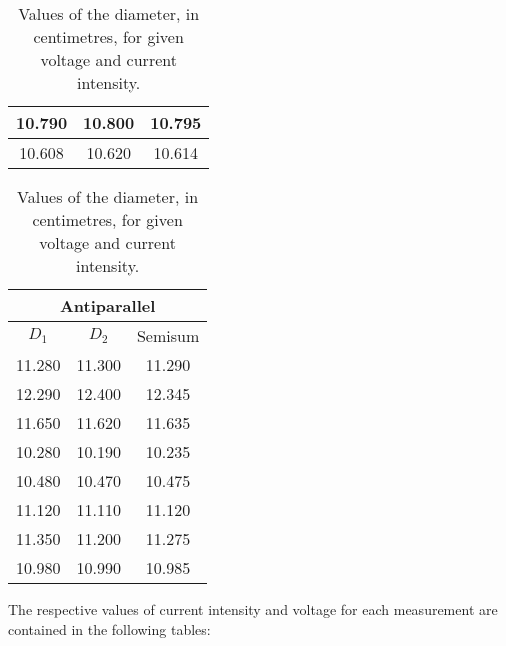 \begin{table}[H]
\begin{tabular}{|c|c|c|}
            \hline
            10.790 & 10.800 & 10.795 \\
            \hline
            10.608 & 10.620 & 10.614 \\
            \hline
        \end{tabular}
        \vspace{1cm}
        \begin{tabular}{|c|c|c|}
            \hline
            \multicolumn{3}{|c|}{\textbf{Antiparallel}} \\
            \hline
            \textbf{$D_1$} & \textbf{$D_2$} & Semisum \\
            \hline
            11.280 & 11.300 & 11.290 \\
            \hline
            12.290 & 12.400 & 12.345 \\
            \hline
            11.650 & 11.620 & 11.635 \\
            \hline
             10.280 & 10.190 & 10.235 \\
            \hline
            10.480 & 10.470 & 10.475 \\
            \hline
            11.120 & 11.110 & 11.120 \\
            \hline
             11.350 & 11.200 & 11.275 \\
            \hline
            10.980 & 10.990 & 10.985 \\
            \hline
        \end{tabular}
    \caption{Values of the diameter, in centimetres, for given voltage and current intensity.}
\end{table}
The respective values of current intensity and voltage for each measurement are contained in the following tables:
